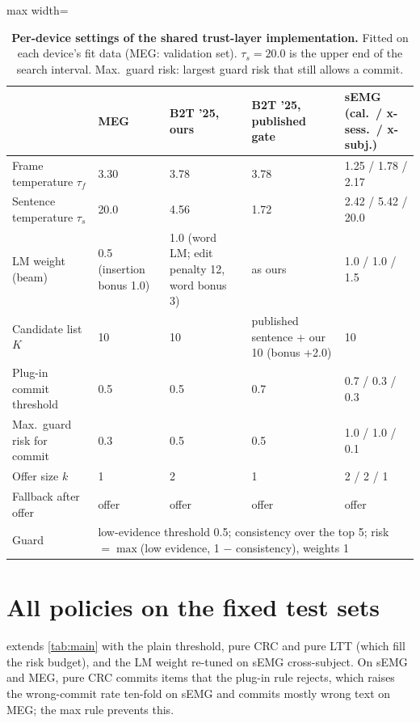 \begin{table}[H]
  \centering
  \caption{\textbf{Per-device settings of the shared trust-layer implementation.} Fitted on each device's fit data (MEG: validation set). $\tau_s = 20.0$ is the upper end of the search interval. Max.\ guard risk: largest guard risk that still allows a commit.}
  \label{tab:settings}
  \small
  \begin{adjustbox}{max width=\linewidth}\begin{tabular}{@{}lllll@{}}
    \toprule
    & \textbf{MEG} & \textbf{B2T '25, ours} & \textbf{B2T '25, published gate} & \textbf{sEMG (cal.\ / x-sess.\ / x-subj.)} \\
    \midrule
    Frame temperature $\tau_f$ & 3.30 & 3.78 & 3.78 & 1.25 / 1.78 / 2.17 \\
    Sentence temperature $\tau_s$ & 20.0 & 4.56 & 1.72 & 2.42 / 5.42 / 20.0 \\
    LM weight (beam) & 0.5 (insertion bonus 1.0) & 1.0 (word LM; edit penalty 12, word bonus 3) & as ours & 1.0 / 1.0 / 1.5 \\
    Candidate list $K$ & 10 & 10 & published sentence + our 10 (bonus +2.0) & 10 \\
    Plug-in commit threshold & 0.5 & 0.5 & 0.7 & 0.7 / 0.3 / 0.3 \\
    Max.\ guard risk for commit & 0.3 & 0.5 & 0.5 & 1.0 / 1.0 / 0.1 \\
    Offer size $k$ & 1 & 2 & 1 & 2 / 2 / 1 \\
    Fallback after offer & offer & offer & offer & offer \\
    Guard & \multicolumn{4}{l}{low-evidence threshold 0.5; consistency over the top 5; risk $=\max$(low evidence, 1 $-$ consistency), weights 1} \\
    \bottomrule
  \end{tabular}\end{adjustbox}
\end{table}

\FloatBarrier
\section{All policies on the fixed test sets}
\label{app:full}

 extends \cref{tab:main} with the plain threshold, pure CRC and pure LTT (which fill the risk budget), and the LM weight re-tuned on sEMG cross-subject. On sEMG and MEG, pure CRC commits items that the plug-in rule rejects, which raises the wrong-commit rate ten-fold on sEMG and commits mostly wrong text on MEG; the max rule prevents this.

